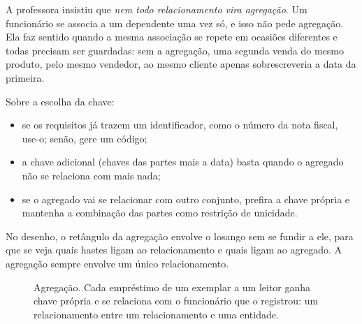 A professora insistiu que \emph{nem todo relacionamento vira agregação}.
Um funcionário se associa a um dependente uma vez só, e isso não pede
agregação. Ela faz sentido quando a mesma associação se repete em
ocasiões diferentes e todas precisam ser guardadas: sem a agregação, uma
segunda venda do mesmo produto, pelo mesmo vendedor, ao mesmo cliente
apenas sobrescreveria a data da primeira.

Sobre a escolha da chave:

\begin{itemize}
	\item se os requisitos já trazem um identificador, como o número da
	nota fiscal, use-o; senão, gere um código;
	\item a chave adicional (chaves das partes mais a data) basta quando o
	agregado não se relaciona com mais nada;
	\item se o agregado vai se relacionar com outro conjunto, prefira a
	chave própria e mantenha a combinação das partes como restrição de
	unicidade.
\end{itemize}

No desenho, o retângulo da agregação envolve o losango sem se fundir a
ele, para que se veja quais hastes ligam ao relacionamento e quais ligam
ao agregado. A agregação sempre envolve um único relacionamento.

\begin{figure}[h]
\centering
{}
\caption{Agregação. Cada empréstimo de um exemplar a um leitor ganha chave
própria e se relaciona com o funcionário que o registrou: um
relacionamento entre um relacionamento e uma entidade.}
\end{figure}

